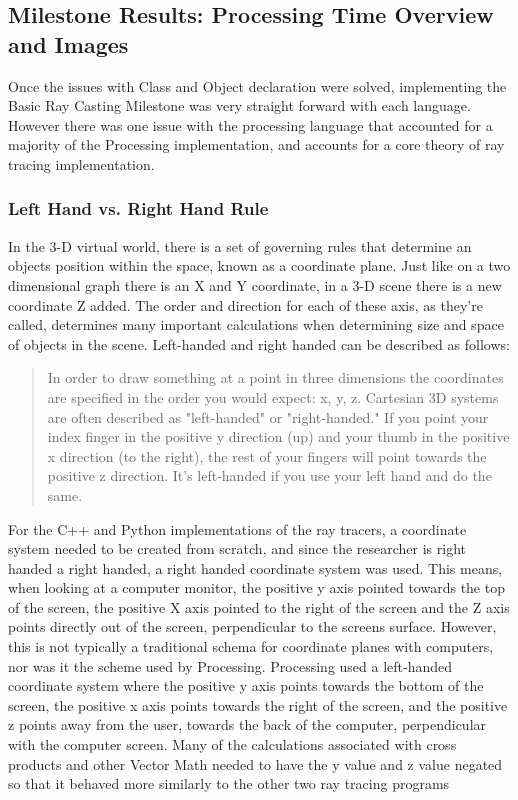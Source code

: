 \subsection{Milestone Results: Processing Time Overview and Images}
Once the issues with Class and Object declaration were solved, implementing the Basic Ray Casting Milestone was very straight forward with each language.  However there was one issue with the processing language that accounted for a majority of the Processing implementation, and accounts for a core theory of ray tracing implementation.
\subsubsection{Left Hand vs. Right Hand Rule}
In the 3-D virtual world, there is a set of governing rules that determine an objects position within the space, known as a coordinate plane.  Just like on a two dimensional graph there is an X and Y coordinate, in a 3-D scene there is a new coordinate Z added.  The order and direction for each of these axis, as they're called, determines many important calculations when determining size and space of objects in the scene.  Left-handed and right handed can be described as follows:

\begin{quote}
In order to draw something at a point in three dimensions the coordinates are specified in the order you would expect: x, y, z. Cartesian 3D systems are often described as "left-handed" or "right-handed." If you point your index finger in the positive y direction (up) and your thumb in the positive x direction (to the right), the rest of your fingers will point towards the positive z direction. It's left-handed if you use your left hand and do the same.
\end{quote}
For the C++ and Python implementations of the ray tracers, a coordinate system needed to be created from scratch, and since the researcher is right handed a right handed, a right handed coordinate system was used.  This means, when looking at a computer monitor, the positive y axis pointed towards the top of the screen, the positive X axis pointed to the right of the screen and the Z axis points directly out of the screen, perpendicular to the screens surface.  However, this is not typically a traditional schema for coordinate planes with computers, nor was it the scheme used by Processing.  Processing used a left-handed coordinate system where the positive y axis points towards the bottom of the screen, the positive x axis points towards the right of the screen, and the positive z points away from the user, towards the back of the computer, perpendicular with the computer screen.  Many of the calculations associated with cross products and other Vector Math needed to have the y value and z value negated so that it behaved more similarly to the other two ray tracing programs
